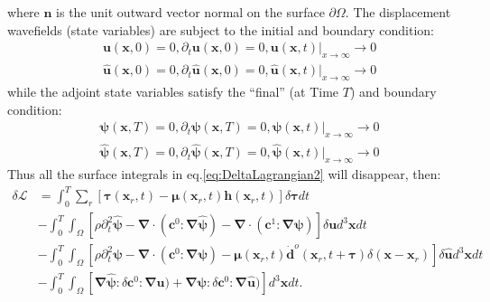 \documentclass[extra,mreferee]{gji}
\newcommand{\bsy}[1]{\boldsymbol{{}#1}}
\begin{document}
where $\mathbf{n}$ is the unit outward vector normal on the surface
$\partial\Omega$. The displacement wavefields (state variables) are subject to the initial and boundary condition:
\begin{equation}
	\begin{split}
	&\mathbf{u}(\mathbf{x},0)=0,\partial_t\mathbf{u}(\mathbf{x},0)=0,
	\mathbf{u}(\mathbf{x},t)\rvert_{x\rightarrow\infty}\to0\\
	&\mathbf{\hat{u}}(\mathbf{x},0)=0,\partial_t\mathbf{\hat{u}}(\mathbf{x},0)=0,
	\mathbf{\hat{u}}(\mathbf{x},t)\rvert_{x\rightarrow\infty}\to0
	\end{split}
        \label{eq:InitialBoundary}
\end{equation}
while the adjoint state variables satisfy the ``final'' (at Time $T$) and boundary condition:
\begin{equation}
	\begin{split}
	&\bsy{\psi}(\mathbf{x},T)=0,\partial_t\bsy{\psi}(\mathbf{x},T)=0,
	\bsy{\psi}(\mathbf{x},t)\rvert_{x\rightarrow\infty}\to0\\
	&\bsy{\hat\psi}(\mathbf{x},T)=0,\partial_t\bsy{\hat{\psi}}(\mathbf{x},T)=0,
	\bsy{\hat{\psi}}(\mathbf{x},t)\rvert_{x\rightarrow\infty}\to0
	\end{split}
        \label{eq:InitialBoundary_2}
\end{equation}
Thus all the surface integrals in eq.\eqref{eq:DeltaLagrangian2} will disappear, then:
\begin{equation}
	\begin{split}
		\delta\mathcal{L}
		&
		=\int^T_0\sum_{r}\left[\bsy{\tau}(\mathbf{x}_r,t)-\bsy{\mu}(\mathbf{x}_r,t)\mathbf{h}(\mathbf{x}_r,t)\right]\delta
		\bsy{\tau}dt \\
		& -\int^T_0\int_{\Omega} \left[\rho\partial^2_t \bsy{\hat \psi} -\bsy{\nabla
		\cdot}	(\bsy{\mathbf{c}}^0\bsy{:\nabla\bsy{\hat
		\psi}})-\bsy{\nabla\cdot}(\bsy{\mathbf{c}}^1\bsy{:\nabla\psi})
		\right]\delta\mathbf{u}d^3\mathbf{x}dt\\
		&
		-\int^T_0\int_{\Omega}\left[\rho\partial^2_t\bsy\psi-\bsy{\nabla\cdot}(\bsy{\mathbf{c}}^0\bsy{:\nabla\bsy\psi})-
		\bsy{\mu}(\mathbf{x}_r,t)\mathbf{\dot{d}}^o(\mathbf{x}_r,t+\bsy{\tau})\delta(\mathbf{x}-\mathbf{x}_r)\right]\delta
		\mathbf{\hat{u}}d^3\mathbf{x}dt\\
		& -\int^T_0\int_{\Omega}\left[
		\bsy{\nabla\hat \psi:}\delta \bsy{\mathbf{c}}^0\bsy{:\nabla\mathbf{u}})
		+\bsy{\nabla\psi:}\delta \bsy{\mathbf{c}}^0\bsy{: \nabla\mathbf{\hat{u}}})\right]
		d^3\mathbf{x}dt.
	\end{split}
        \label{eq:DeltaLagrangian3}
\end{equation}
\end{document}
